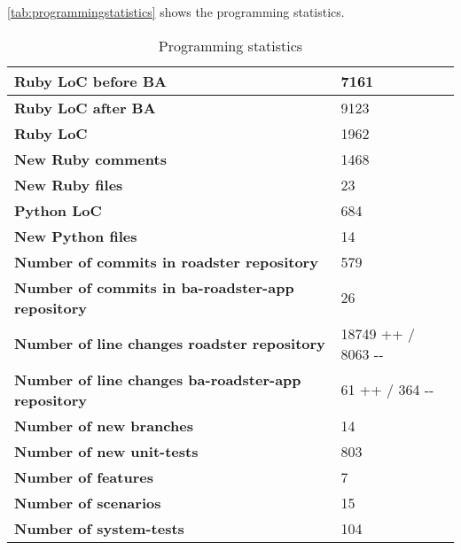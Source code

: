 \autoref{tab:programmingstatistics} shows the programming statistics.
\begin{table}[H]
  \centering
  \begin{tabular}{|m{50mm}|m{30mm}|}
   \hline
	\bf Ruby LoC before BA & 7161 \\
	\hline
	\bf Ruby LoC after BA  & 9123 \\
	\hline
	\bf Ruby LoC & 1962 \\
	\hline
	\bf New Ruby comments & 1468 \\
	\hline
	\bf New Ruby files & 23 \\
	\hline
	\bf Python LoC & 684 \\
	\hline
	\bf New Python files & 14 \\
	\hline
	\bf Number of commits in 
		\newline roadster repository & 579 \\
	\hline
	\bf Number of commits in 
		\newline ba-roadster-app repository & 26 \\
	\hline
	\bf Number of line changes 
		\newline roadster repository & 18749{\color{green!70} ++} / 8063{\color{red!70} -{}-} \\
	\hline
	\bf Number of line changes 
		\newline ba-roadster-app repository & 61{\color{green!70} ++} / 364{\color{red!70} -{}-} \\
	\hline
	\bf Number of new branches & 14 \\
	\hline
	\bf Number of new unit-tests & 803 \\
	\hline
	\bf Number of features & 7 \\
	\hline
	\bf Number of scenarios & 15 \\
	\hline
	\bf Number of system-tests & 104 \\
    \hline
  \end{tabular} \\
  \caption{Programming statistics}
  \label{tab:programmingstatistics}
\end{table}
